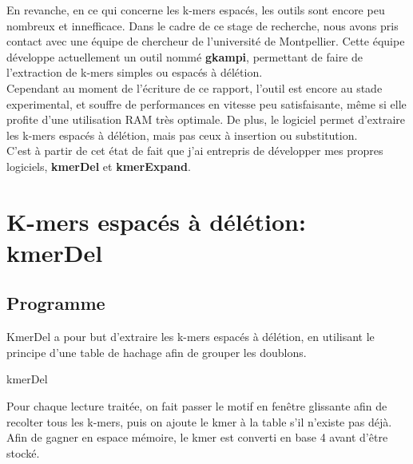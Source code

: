 \documentclass{report}
\begin{document}
      En revanche, en ce qui concerne les k-mers espacés, les outils sont encore peu nombreux et innefficace.
      Dans le cadre de ce stage de recherche, nous avons pris contact avec une équipe de chercheur de l'université de Montpellier. Cette équipe développe actuellement un outil nommé \textbf{gkampi}, permettant de faire de l'extraction de k-mers simples ou espacés à délétion.\\

      Cependant au moment de l'écriture de ce rapport, l'outil est encore au stade experimental, et souffre de performances en vitesse peu satisfaisante, même si elle profite d'une utilisation RAM très optimale. De plus, le logiciel permet d'extraire les k-mers espacés à délétion, mais pas ceux à insertion ou substitution.\\

      C'est à partir de cet état de fait que j'ai entrepris de développer mes propres logiciels, \textbf{kmerDel} et \textbf{kmerExpand}.
  \chapter{K-mers espacés à délétion: kmerDel}
    \section{Programme}
      KmerDel a pour but d'extraire les k-mers espacés à délétion, en utilisant le principe d'une table de hachage afin de grouper les doublons.\bigskip\\
      \normalsize
      \begin{algorithm}[H]{
        \caption{kmerDel}
      }\end{algorithm}
      \large
      Pour chaque lecture traitée, on fait passer le motif en fenêtre glissante afin de recolter tous les k-mers, puis on ajoute le kmer à la table s'il n'existe pas déjà. Afin de gagner en espace mémoire, le kmer est converti en base 4 avant d'être stocké.\\
\end{document}
